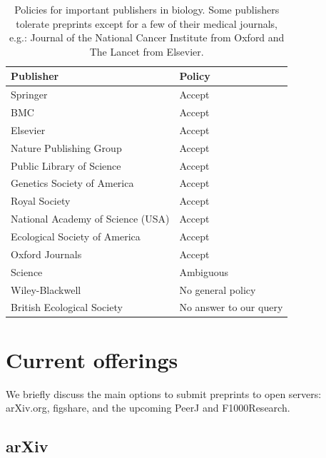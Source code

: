 \documentclass[letterpaper,twocolumn,superscriptaddress,showkeys,longbibliography]{revtex4-1}
\begin{document}
\begin{table}
    \centering
    \begin{tabular}{|ll|}
    \hline
    Publisher                                   & Policy \\
    \hline
    Springer                            	& Accept \\
    BMC                                 	& Accept \\
    Elsevier                            	& Accept \\
    Nature Publishing Group             	& Accept \\
    Public Library of Science           	& Accept \\
    Genetics Society of America                 & Accept \\
    Royal Society                       	& Accept \\
    National Academy of Science (USA)           & Accept \\
    Ecological Society of America       	& Accept \\
    Oxford Journals                             & Accept \\
    Science                             	& Ambiguous \\
    Wiley-Blackwell                       	& No general policy \\
    British Ecological Society                  & No answer to our query \\
    \hline
    \end{tabular}
    \caption{Policies for important publishers in biology. Some publishers
tolerate preprints except for a few of their medical journals, e.g.: Journal
of the National Cancer Institute from Oxford and The Lancet from Elsevier.}
    \label{table:policies}
\end{table}

\section{Current offerings}

We briefly discuss the main options to submit preprints to open servers:
arXiv.org, figshare, and the upcoming PeerJ and F1000Research.

\subsection{arXiv}
\end{document}
